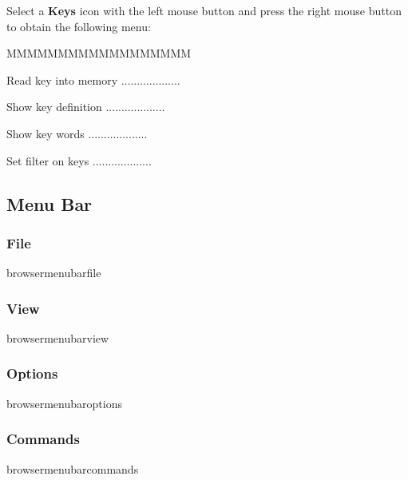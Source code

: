 Select a {\bf \RZ{} Keys} icon with the left mouse button and press
the right mouse button to obtain the following menu:


\begin{DLsf}{MMMMMMMMMMMMMMMMMM}
\item[Read key into memory]      ...................
\item[Show key definition]       ...................
\item[Show key words]            ...................
\item[Set filter on keys]        ...................
\end{DLsf}


\subsection{Menu Bar}


\subsubsection{File}

\begin{PAWf}{browsermenubarfile}
\end{PAWf}

\subsubsection{View}

\begin{PAWf}{browsermenubarview}
\end{PAWf}

\subsubsection{Options}

\begin{PAWf}{browsermenubaroptions}
\end{PAWf}

\subsubsection{Commands}

\begin{PAWf}{browsermenubarcommands}
\end{PAWf}

